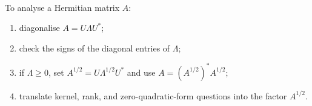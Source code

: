 \begin{method} \label{meth:psd-spectral-factorization} \\
To analyse a Hermitian matrix $A$:
\begin{enumerate}[label=(\roman*)]
\setlength{\itemsep}{0pt}
\item diagonalise $A=U\Lambda U^*$;
\item check the signs of the diagonal entries of $\Lambda$;
\item if $\Lambda\geq0$, set $A^{1/2}=U\Lambda^{1/2}U^*$ and use $A=(A^{1/2})^*A^{1/2}$;
\item translate kernel, rank, and zero-quadratic-form questions into the factor $A^{1/2}$.
\end{enumerate}
\end{method}

